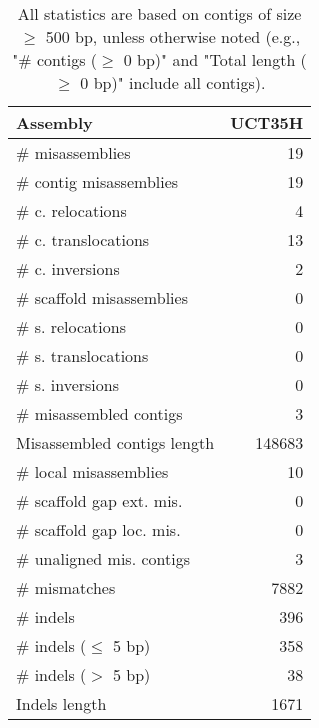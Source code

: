 \documentclass[12pt,a4paper]{article}
\begin{document}
\begin{table}[ht]
\begin{center}
\caption{All statistics are based on contigs of size $\geq$ 500 bp, unless otherwise noted (e.g., "\# contigs ($\geq$ 0 bp)" and "Total length ($\geq$ 0 bp)" include all contigs).}
\begin{tabular}{|l*{1}{|r}|}
\hline
Assembly & UCT35H \\ \hline
\# misassemblies & 19 \\ \hline
\hspace{2mm}\# contig misassemblies & 19 \\ \hline
\hspace{5mm}\# c. relocations & 4 \\ \hline
\hspace{5mm}\# c. translocations & 13 \\ \hline
\hspace{5mm}\# c. inversions & 2 \\ \hline
\hspace{2mm}\# scaffold misassemblies & 0 \\ \hline
\hspace{5mm}\# s. relocations & 0 \\ \hline
\hspace{5mm}\# s. translocations & 0 \\ \hline
\hspace{5mm}\# s. inversions & 0 \\ \hline
\# misassembled contigs & 3 \\ \hline
Misassembled contigs length & 148683 \\ \hline
\# local misassemblies & 10 \\ \hline
\# scaffold gap ext. mis. & 0 \\ \hline
\# scaffold gap loc. mis. & 0 \\ \hline
\# unaligned mis. contigs & 3 \\ \hline
\# mismatches & 7882 \\ \hline
\# indels & 396 \\ \hline
\hspace{5mm}\# indels ($\leq$ 5 bp) & 358 \\ \hline
\hspace{5mm}\# indels ($>$ 5 bp) & 38 \\ \hline
Indels length & 1671 \\ \hline
\end{tabular}
\end{center}
\end{table}
\end{document}
